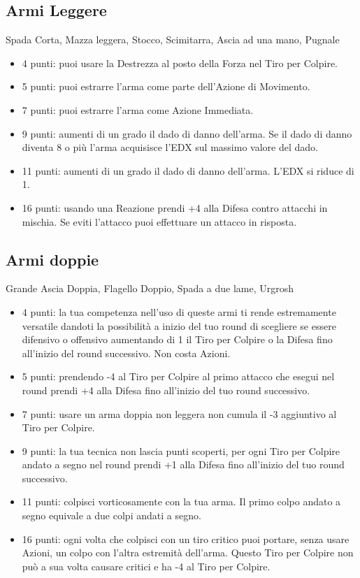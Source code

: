 \begin{multicols}{2}
\subsection{Armi Leggere} Spada Corta, Mazza leggera, Stocco, Scimitarra, Ascia ad una mano, Pugnale\label{listaarmileggere}

\begin{itemize}[leftmargin=*] \setlength{\itemsep}{0pt}

\item 4 punti: puoi usare la Destrezza al posto della Forza nel Tiro per Colpire.
\item 5 punti: puoi estrarre l'arma come parte dell'Azione di Movimento.
\item 7 punti: puoi estrarre l'arma come Azione Immediata.
\item 9 punti: aumenti di un grado il dado di danno dell'arma. Se il dado di danno diventa 8 o più l'arma acquisisce l'EDX sul massimo valore del dado.
\item 11 punti: aumenti di un grado il dado di danno dell'arma. L'EDX si riduce di 1.
\item 16 punti: usando una Reazione prendi +4 alla Difesa contro attacchi in mischia. Se eviti l'attacco puoi effettuare un attacco in risposta.

\end{itemize}

\subsection{Armi doppie}  Grande Ascia Doppia, Flagello Doppio, Spada a due lame, Urgrosh\label{listaarmidoppie}

\begin{itemize}[leftmargin=*] \setlength{\itemsep}{0pt}
\item 4 punti: la tua competenza nell'uso di queste armi ti rende estremamente versatile dandoti la possibilità a inizio del tuo round di scegliere se essere difensivo o offensivo aumentando di 1 il Tiro per Colpire o la Difesa fino all'inizio del round successivo. Non costa Azioni.
\item 5 punti: prendendo -4 al Tiro per Colpire al primo attacco che esegui nel round prendi +4 alla Difesa fino all'inizio del tuo round successivo.
\item 7 punti: usare un arma doppia non leggera non cumula il -3 aggiuntivo al Tiro per Colpire.
\item 9 punti: la tua tecnica non lascia punti scoperti, per ogni Tiro per Colpire andato a segno nel round prendi +1 alla Difesa fino all'inizio del tuo round successivo.
\item 11 punti: colpisci vorticosamente con la tua arma. Il primo colpo andato a segno equivale a due colpi andati a segno.
\item 16 punti: ogni volta che colpisci con un tiro critico puoi portare, senza usare Azioni, un colpo con l'altra estremità dell'arma. Questo Tiro per Colpire non può a sua volta causare critici e ha -4 al Tiro per Colpire.


\end{itemize}
\end{multicols}
